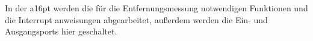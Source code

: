 

In der a16pt werden die für die Entfernungsmessung notwendigen Funktionen und die Interrupt anweisungen abgearbeitet, außerdem werden die Ein- und Ausgangsports hier geschaltet.\\
